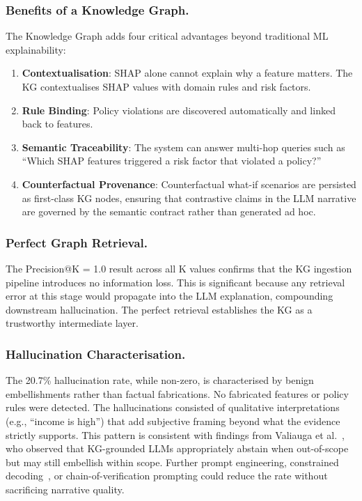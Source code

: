 \documentclass[lnbip]{svmultln}
\begin{document}
\subsubsection{Benefits of a Knowledge Graph.}
The Knowledge Graph adds four critical advantages beyond traditional ML explainability:
\begin{enumerate}
    \item \textbf{Contextualisation}: SHAP alone cannot explain why a feature matters. The KG contextualises SHAP values with domain rules and risk factors.
    \item \textbf{Rule Binding}: Policy violations are discovered automatically and linked back to features.
    \item \textbf{Semantic Traceability}: The system can answer multi-hop queries such as ``Which SHAP features triggered a risk factor that violated a policy?''
    \item \textbf{Counterfactual Provenance}: Counterfactual what-if scenarios are persisted as first-class KG nodes, ensuring that contrastive claims in the LLM narrative are governed by the semantic contract rather than generated ad hoc.
\end{enumerate}

\subsubsection{Perfect Graph Retrieval.}
The Precision@K = 1.0 result across all K values confirms that the KG ingestion pipeline introduces no information loss. This is significant because any retrieval error at this stage would propagate into the LLM explanation, compounding downstream hallucination. The perfect retrieval establishes the KG as a trustworthy intermediate layer.

\subsubsection{Hallucination Characterisation.}
The 20.7\% hallucination rate, while non-zero, is characterised by benign embellishments rather than factual fabrications. No fabricated features or policy rules were detected. The hallucinations consisted of qualitative interpretations (e.g., ``income is high'') that add subjective framing beyond what the evidence strictly supports. This pattern is consistent with findings from Valiauga et al.~\cite{racds2026}, who observed that KG-grounded LLMs appropriately abstain when out-of-scope but may still embellish within scope. Further prompt engineering, constrained decoding~\cite{depress2025}, or chain-of-verification prompting could reduce the rate without sacrificing narrative quality.
\end{document}
